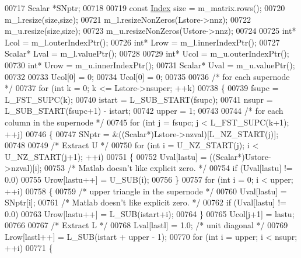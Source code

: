 \begin{DoxyCode}
00717     Scalar      *SNptr;
00718 
00719     \textcolor{keyword}{const} \hyperlink{namespace_eigen_a62e77e0933482dafde8fe197d9a2cfde}{Index} size = m\_matrix.rows();
00720     m\_l.resize(size,size);
00721     m\_l.resizeNonZeros(Lstore->nnz);
00722     m\_u.resize(size,size);
00723     m\_u.resizeNonZeros(Ustore->nnz);
00724 
00725     \textcolor{keywordtype}{int}* Lcol = m\_l.outerIndexPtr();
00726     \textcolor{keywordtype}{int}* Lrow = m\_l.innerIndexPtr();
00727     Scalar* Lval = m\_l.valuePtr();
00728 
00729     \textcolor{keywordtype}{int}* Ucol = m\_u.outerIndexPtr();
00730     \textcolor{keywordtype}{int}* Urow = m\_u.innerIndexPtr();
00731     Scalar* Uval = m\_u.valuePtr();
00732 
00733     Ucol[0] = 0;
00734     Ucol[0] = 0;
00735 
00736     \textcolor{comment}{/* for each supernode */}
00737     \textcolor{keywordflow}{for} (\textcolor{keywordtype}{int} k = 0; k <= Lstore->nsuper; ++k)
00738     \{
00739       fsupc   = L\_FST\_SUPC(k);
00740       istart  = L\_SUB\_START(fsupc);
00741       nsupr   = L\_SUB\_START(fsupc+1) - istart;
00742       upper   = 1;
00743 
00744       \textcolor{comment}{/* for each column in the supernode */}
00745       \textcolor{keywordflow}{for} (\textcolor{keywordtype}{int} j = fsupc; j < L\_FST\_SUPC(k+1); ++j)
00746       \{
00747         SNptr = &((Scalar*)Lstore->nzval)[L\_NZ\_START(j)];
00748 
00749         \textcolor{comment}{/* Extract U */}
00750         \textcolor{keywordflow}{for} (\textcolor{keywordtype}{int} i = U\_NZ\_START(j); i < U\_NZ\_START(j+1); ++i)
00751         \{
00752           Uval[lastu] = ((Scalar*)Ustore->nzval)[i];
00753           \textcolor{comment}{/* Matlab doesn't like explicit zero. */}
00754           \textcolor{keywordflow}{if} (Uval[lastu] != 0.0)
00755             Urow[lastu++] = U\_SUB(i);
00756         \}
00757         \textcolor{keywordflow}{for} (\textcolor{keywordtype}{int} i = 0; i < upper; ++i)
00758         \{
00759           \textcolor{comment}{/* upper triangle in the supernode */}
00760           Uval[lastu] = SNptr[i];
00761           \textcolor{comment}{/* Matlab doesn't like explicit zero. */}
00762           \textcolor{keywordflow}{if} (Uval[lastu] != 0.0)
00763             Urow[lastu++] = L\_SUB(istart+i);
00764         \}
00765         Ucol[j+1] = lastu;
00766 
00767         \textcolor{comment}{/* Extract L */}
00768         Lval[lastl] = 1.0; \textcolor{comment}{/* unit diagonal */}
00769         Lrow[lastl++] = L\_SUB(istart + upper - 1);
00770         \textcolor{keywordflow}{for} (\textcolor{keywordtype}{int} i = upper; i < nsupr; ++i)
00771         \{

\end{DoxyCode}
